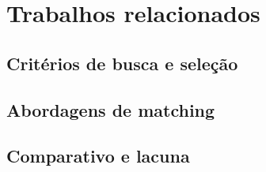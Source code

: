\chapter{Trabalhos relacionados}
\label{chap:trabalhosrelacionados}


\section{Critérios de busca e seleção}
\label{sec:trabalhosrelacionados-criterios-de-busca-e-selecao}

\section{Abordagens de matching}
\label{sec:trabalhosrelacionados-abordagens-de-matching}

\section{Comparativo e lacuna}
\label{sec:trabalhosrelacionados-comparativo-e-lacuna}
